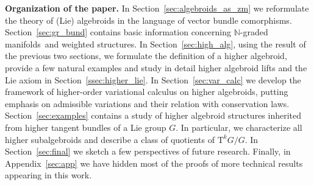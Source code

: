 \documentclass[pdftex]{sigma}
\newcommand{\grBs}{{$\N$-graded manifolds}}
\newcommand{\Zakrzewski}{{vector bundle comorphism}}
\newcommand{\N}{\mathbb{N}}
\newcommand{\TT}[1]{\mathrm{T}^{#1}} %
\numberwithin{equation}{section}
\theoremstyle{definition}
\begin{document}
{\bf Organization of the paper.} In Section~\ref{sec:algebroids_as_zm} we reformulate the theory of (Lie) algebroids in the language of \Zakrzewski s. Section~\ref{sec:gr_bund} contains basic information concerning \grBs\ and weighted structures. In Section~\ref{sec:high_alg}, using the result of the previous two sections, we formulate the definition of a higher algebroid, provide a few natural examples and study in detail higher algebroid lifts and the Lie axiom in Section~\ref{ssec:higher_lie}. In Section~\ref{sec:var_calc} we develop the framework of higher-order variational calculus on higher algebroids, putting emphasis on admissible variations and their relation with conservation laws. Section~\ref{sec:examples} contains a study of higher algebroid structures inherited from higher tangent bundles of a Lie group $G$. In particular, we characterize all higher subalgebroids and describe a class of quotients of $\TT{k} G/G$. In Section~\ref{sec:final} we sketch a few perspectives of future research. Finally, in Appendix~\ref{sec:app} we have hidden most of the proofs of more technical results appearing in this work.
\end{document}
